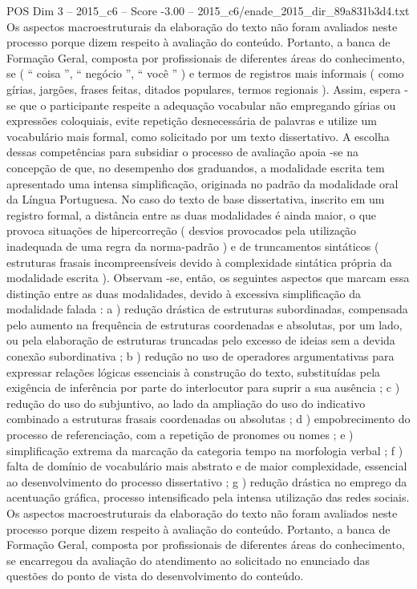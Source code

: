 \begin{textsample}{POS Dim 3 – 2015\_c6 – Score -3.00 – 2015\_c6/enade\_2015\_dir\_89a831b3d4.txt}
Os aspectos macroestruturais da elaboração do texto não foram avaliados neste processo porque dizem respeito à avaliação do conteúdo.
Portanto, a banca de Formação Geral, composta por profissionais de diferentes áreas do conhecimento, se ( “ coisa ”, “ negócio ”, “ você ” ) e termos de registros mais informais ( como gírias, jargões, frases feitas, ditados populares, termos regionais ).
Assim, espera -se que o participante respeite a adequação vocabular não empregando gírias ou expressões coloquiais, evite repetição desnecessária de palavras e utilize um vocabulário mais formal, como solicitado por um texto dissertativo.
A escolha dessas competências para subsidiar o processo de avaliação apoia -se na concepção de que, no desempenho dos graduandos, a modalidade escrita tem apresentado uma intensa simplificação, originada no padrão da modalidade oral da Língua Portuguesa.
No caso do texto de base dissertativa, inscrito em um registro formal, a distância entre as duas modalidades é ainda maior, o que provoca situações de hipercorreção ( desvios provocados pela utilização inadequada de uma regra da norma-padrão ) e de truncamentos sintáticos ( estruturas frasais incompreensíveis devido à complexidade sintática própria da modalidade escrita ).
Observam -se, então, os seguintes aspectos que marcam essa distinção entre as duas modalidades, devido à excessiva simplificação da modalidade falada : a ) redução drástica de estruturas subordinadas, compensada pelo aumento na frequência de estruturas coordenadas e absolutas, por um lado, ou pela elaboração de estruturas truncadas pelo excesso de ideias sem a devida conexão subordinativa ; b ) redução no uso de operadores argumentativas para expressar relações lógicas essenciais à construção do texto, substituídas pela exigência de inferência por parte do interlocutor para suprir a sua ausência ; c ) redução do uso do subjuntivo, ao lado da ampliação do uso do indicativo combinado a estruturas frasais coordenadas ou absolutas ; d ) empobrecimento do processo de referenciação, com a repetição de pronomes ou nomes ; e ) simplificação extrema da marcação da categoria tempo na morfologia verbal ; f ) falta de domínio de vocabulário mais abstrato e de maior complexidade, essencial ao desenvolvimento do processo dissertativo ; g ) redução drástica no emprego da acentuação gráfica, processo intensificado pela intensa utilização das redes sociais.
Os aspectos macroestruturais da elaboração do texto não foram avaliados neste processo porque dizem respeito à avaliação do conteúdo.
Portanto, a banca de Formação Geral, composta por profissionais de diferentes áreas do conhecimento, se encarregou da avaliação do atendimento ao solicitado no enunciado das questões do ponto de vista do desenvolvimento do conteúdo.

\end{textsample}
